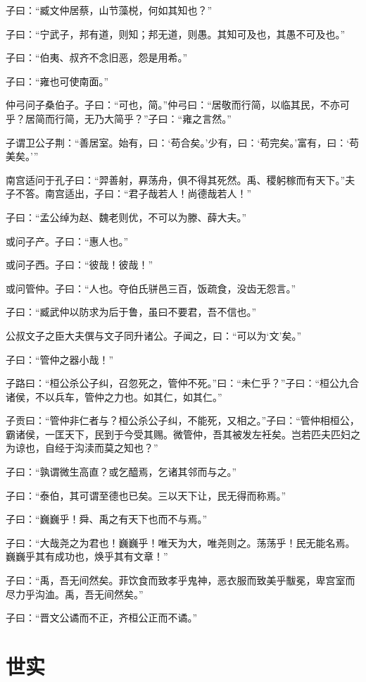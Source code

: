 \documentclass[a5paper]{ctexbook}
\begin{document}
    子曰：“臧文仲居蔡，山节藻棁，何如其知也？”

    子曰：“宁武子，邦有道，则知；邦无道，则愚。其知可及也，其愚不可及也。”

    子曰：“伯夷、叔齐不念旧恶，怨是用希。”

    子曰：“雍也可使南面。”

    仲弓问子桑伯子。子曰：“可也，简。”仲弓曰：“居敬而行简，以临其民，不亦可乎？居简而行简，无乃大简乎？”子曰：“雍之言然。”

    子谓卫公子荆：“善居室。始有，曰：‘苟合矣。’少有，曰：‘苟完矣。’富有，曰：‘苟美矣。’”

    南宫适问于孔子曰：“羿善射，奡荡舟，俱不得其死然。禹、稷躬稼而有天下。”夫子不答。南宫适出，子曰：“君子哉若人！尚德哉若人！”

    子曰：“孟公绰为赵、魏老则优，不可以为滕、薛大夫。”

    或问子产。子曰：“惠人也。”
    
    或问子西。子曰：“彼哉！彼哉！”

    或问管仲。子曰：“人也。夺伯氏骈邑三百，饭疏食，没齿无怨言。”

    子曰：“臧武仲以防求为后于鲁，虽曰不要君，吾不信也。”

    公叔文子之臣大夫僎与文子同升诸公。子闻之，曰：“可以为‘文’矣。”

    子曰：“管仲之器小哉！”

    子路曰：“桓公杀公子纠，召忽死之，管仲不死。”曰：“未仁乎？”子曰：“桓公九合诸侯，不以兵车，管仲之力也。如其仁，如其仁。”

    子贡曰：“管仲非仁者与？桓公杀公子纠，不能死，又相之。”子曰：“管仲相桓公，霸诸侯，一匡天下，民到于今受其赐。微管仲，吾其被发左衽矣。岂若匹夫匹妇之为谅也，自经于沟渎而莫之知也？”

    子曰：“孰谓微生高直？或乞醯焉，乞诸其邻而与之。”

    子曰：“泰伯，其可谓至德也已矣。三以天下让，民无得而称焉。”

    子曰：“巍巍乎！舜、禹之有天下也而不与焉。”

    子曰：“大哉尧之为君也！巍巍乎！唯天为大，唯尧则之。荡荡乎！民无能名焉。巍巍乎其有成功也，焕乎其有文章！”

    子曰：“禹，吾无间然矣。菲饮食而致孝乎鬼神，恶衣服而致美乎黻冕，卑宫室而尽力乎沟洫。禹，吾无间然矣。”

    子曰：“晋文公谲而不正，齐桓公正而不谲。”

    \chapter{世实}
\end{document}
